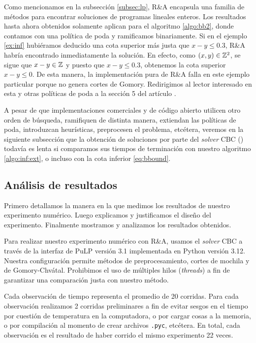 Como mencionamos en la subsección \ref{subsec:lp}, R\&A encapsula una familia de métodos para
encontrar soluciones de programas lineales enteros. Los resultados hasta ahora obtenidos solamente
aplican para el algoritmo \ref{algo:bb2}, donde contamos con una política de poda y ramificamos
binariamente. Si en el ejemplo \ref{ex:inf} hubiéramos deducido una cota superior más justa que $x -
y \leq 0.3$, R\&A habría encontrado inmediatamente la solución. En efecto, como $(x, y) \in \mathbb{Z}^2$,
se sigue que $x - y \in \mathbb{Z}$ y puesto que $x - y \leq 0.3$, obtenemos la cota superior $x - y \leq
0$. De esta manera, la implementación pura de R\&A falla en este ejemplo particular porque no genera
cortes de Gomory. Redirigimos al lector interesado en esta y otras políticas de poda a la sección 5
del artículo \cite{morrison}.

A pesar de que implementaciones comerciales y de código abierto utilicen otro orden de búsqueda,
ramifiquen de distinta manera, extiendan las políticas de poda, introduzcan heurísticas, preprocesen
el problema, etcétera, veremos en la siguiente subsección que la obtención de soluciones por parte
del \textit{solver} CBC (\cite{coin}) todavía es lenta si comparamos sus tiempos de terminación con
nuestro algoritmo \ref{algo:inf:ext}, o incluso con la cota inferior \eqref{eq:bbound}.
\subsection{Análisis de resultados}
\label{subsec:inf:res}
\noindent
Primero detallamos la manera en la que medimos los resultados de nuestro experimento numérico.
Luego explicamos y justificamos el diseño del experimento. Finalmente mostramos y analizamos los
resultados obtenidos.

Para realizar nuestro experimento numérico con R\&A, usamos el \textit{solver} CBC a través de la
interfaz de PuLP versión 3.1 implementada en Python versión 3.12. Nuestra configuración permite
métodos de preprocesamiento, cortes de mochila y de Gomory-Chvátal. Prohibimos el uso de
múltiples hilos (\textit{threads}) a fin de garantizar una comparación justa con nuestro método.

Cada observación de tiempo representa el promedio de 20 corridas. Para cada observación realizamos 2
corridas preliminares a fin de evitar sesgos en el tiempo por cuestión de temperatura en la
computadora, o por cargar cosas a la memoria, o por compilación al momento de crear archivos
\texttt{.pyc}, etcétera. En total, cada observación es el resultado de haber corrido el mismo
experimento 22 veces.

